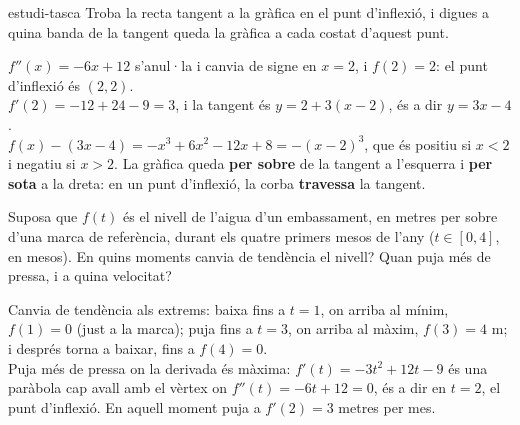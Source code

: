 \begin{apartats}
\begin{tria}{estudi-tasca}
Troba la recta tangent a la gràfica en el punt d'inflexió, i digues a quina banda de la tangent
queda la gràfica a cada costat d'aquest punt.

\begin{solucio}
$f''(x)=-6x+12$ s'anul·la i canvia de signe en $x=2$, i $f(2)=2$: el punt d'inflexió és $(2,2)$.\\
$f'(2)=-12+24-9=3$, i la tangent és $y=2+3(x-2)$, és a dir $\boxed{y=3x-4}$.\\
$f(x)-(3x-4)=-x^3+6x^2-12x+8=-(x-2)^3$, que és positiu si $x<2$ i negatiu si $x>2$. La gràfica queda
\textbf{per sobre} de la tangent a l'esquerra i \textbf{per sota} a la dreta: en un punt d'inflexió,
la corba \textbf{travessa} la tangent.
\end{solucio}

Suposa que $f(t)$ és el nivell de l'aigua d'un embassament, en metres per sobre d'una marca de referència,
durant els quatre primers mesos de l'any ($t\in[0,4]$, en mesos). En quins moments canvia de tendència el
nivell? Quan puja més de pressa, i a quina velocitat?

\begin{solucio}
Canvia de tendència als extrems: baixa fins a $t=1$, on arriba al mínim, $f(1)=0$ (just a la marca); puja
fins a $t=3$, on arriba al màxim, $f(3)=4$ m; i després torna a baixar, fins a $f(4)=0$.\\
Puja més de pressa on la derivada és màxima: $f'(t)=-3t^2+12t-9$ és una paràbola cap avall amb el vèrtex
on $f''(t)=-6t+12=0$, és a dir en $t=2$, el punt d'inflexió. En aquell moment puja a $f'(2)=3$ metres per mes.
\end{solucio}
\end{tria}

\end{apartats}
